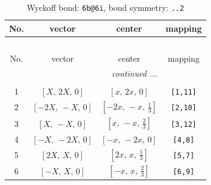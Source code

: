 \documentclass[fleqn,8pt]{jsarticle}
\begin{document}
\begin{longtable}{cccc}
\caption{Wyckoff bond: {\tt 6b@6i}, bond symmetry: {\tt ..2}}
 \\
 \hline \hline
No. & vector & center & mapping \\ \hline \endfirsthead

\multicolumn{3}{l}{\tablename\ \thetable{}} \\
 \hline \hline
No. & vector & center & mapping \\ \hline \endhead

 \hline \hline
\multicolumn{3}{r}{\footnotesize\it continued ...} \\ \endfoot

 \hline \hline
\multicolumn{3}{r}{} \\ \endlastfoot

1 & $\left[ X,\, 2 X,\, 0 \right]$ & $\left[ x,\, 2 x,\, 0 \right]$ & {\tt [1,11]} \\ \hline
2 & $\left[ - 2 X,\, - X,\, 0 \right]$ & $\left[ - 2 x,\, - x,\, \frac{1}{3} \right]$ & {\tt [2,10]} \\ \hline
3 & $\left[ X,\, - X,\, 0 \right]$ & $\left[ x,\, - x,\, \frac{2}{3} \right]$ & {\tt [3,12]} \\ \hline
4 & $\left[ - X,\, - 2 X,\, 0 \right]$ & $\left[ - x,\, - 2 x,\, 0 \right]$ & {\tt [4,8]} \\ \hline
5 & $\left[ 2 X,\, X,\, 0 \right]$ & $\left[ 2 x,\, x,\, \frac{1}{3} \right]$ & {\tt [5,7]} \\ \hline
6 & $\left[ - X,\, X,\, 0 \right]$ & $\left[ - x,\, x,\, \frac{2}{3} \right]$ & {\tt [6,9]} \\
\end{longtable}
\renewcommand{\arraystretch}{1.2}
\end{document}
